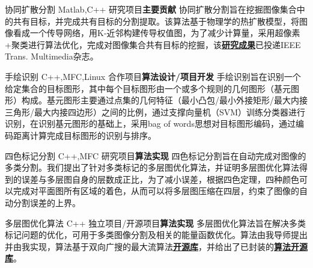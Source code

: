 \documentclass[11pt,a4paper,sans]{moderncv}   %
\begin{document}
\begin{CJK}{UTF8}{gbsn}
{协同扩散分割}
{Matlab,C++}
{研究项目}{\textbf{主要贡献}}
{协同扩散分割旨在挖掘图像集合中的共有目标，并完成共有目标的分割提取。该算法基于物理学的热扩散模型，将图像看成一个传导网络，用K-近邻构建传导权值图，为了减少计算量，采用超像素+聚类进行算法优化，完成对图像集合共有目标的挖掘，该\textbf{\href{http://files.cnblogs.com/moondark/XiangliLiao_CoDiffusion.pdf}{研究成果}}已投递IEEE Trans. Multimedia杂志。}
\vspace*{0.2\baselineskip}

{手绘识别}
{C++,MFC,Linux}
{合作项目}{\textbf{算法设计/项目开发}}
{手绘识别旨在识别一个给定集合的目标图形，其中每个目标图形由一个或多个规则的几何图形（基元图形）构成。基元图形主要通过点集的几何特征（最小凸包/最小外接矩形/最大内接三角形/最大内接四边形）之间的比例，通过支撑向量机（SVM）训练分类器进行识别，在识别基元图形的基础上，采用bag of words思想对目标图形编码，通过编码距离计算完成目标图形的识别与排序。}
\vspace*{0.2\baselineskip}

{四色标记分割}
{C++,MFC}
{研究项目}{\textbf{算法实现}}
{四色标记分割旨在自动完成对图像的多类分割。我们提出了针对多类标记的多层图优化算法，并证明多层图优化算法得到的误差与多层图自身的层数成正比，为了减小误差，根据四色定理，四种颜色可以完成对平面图所有区域的着色，从而可以将多层图压缩在四层，约束了图像的自动分割误差的上界。}
\vspace*{0.2\baselineskip}

{多层图优化算法}
{C++}
{独立项目/开源项目}{\textbf{算法实现}}
{多层图优化算法旨在解决多类标记问题的优化，可用于多类图像分割及相关的能量函数优化。算法由我导师提出并由我实现，算法基于双向广搜的最大流算法\textbf{\href{http://vision.csd.uwo.ca/code/}{开源库}}，并给出了已封装的\textbf{\href{https://github.com/liaoxl/MultiLayerGraph}{算法开源库}}。}
\vspace*{0.2\baselineskip}


\renewcommand{\baselinestretch}{1.0}

\closesection{}                   %
\renewcommand{\listitemsymbol}{-} %
\clearpage\end{CJK}
\end{document}
